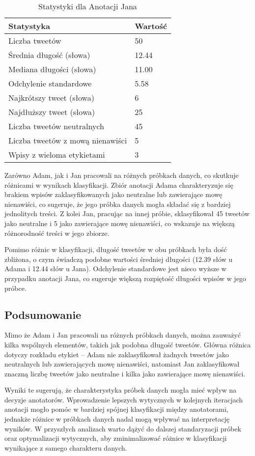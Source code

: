 \documentclass[12pt]{article}
\begin{document}
\begin{table}[h]
    \centering
    \caption{Statystyki dla Anotacji Jana}
    \label{tab:jan_stats}
    \begin{tabular}{|l|l|}
        \hline
        Statystyka & Wartość \\ \hline
        Liczba tweetów & 50 \\ \hline
        Średnia długość (słowa) & 12.44 \\ \hline
        Mediana długości (słowa) & 11.00 \\ \hline
        Odchylenie standardowe & 5.58 \\ \hline
        Najkrótszy tweet (słowa) & 6 \\ \hline
        Najdłuższy tweet (słowa) & 25 \\ \hline
        Liczba tweetów neutralnych & 45 \\ \hline
        Liczba tweetów z mową nienawiści & 5 \\ \hline
        Wpisy z wieloma etykietami & 3 \\ \hline
    \end{tabular}
\end{table}

Zarówno Adam, jak i Jan pracowali na różnych próbkach danych, co skutkuje różnicami w wynikach klasyfikacji. Zbiór anotacji Adama charakteryzuje się brakiem wpisów zaklasyfikowanych jako neutralne lub zawierające mowę nienawiści, co sugeruje, że jego próbka danych mogła składać się z bardziej jednolitych treści. Z kolei Jan, pracując na innej próbie, sklasyfikował 45 tweetów jako neutralne i 5 jako zawierające mowę nienawiści, co wskazuje na większą różnorodność treści w jego zbiorze.

Pomimo różnic w klasyfikacji, długość tweetów w obu próbkach była dość zbliżona, o czym świadczą podobne wartości średniej długości (12.39 słów u Adama i 12.44 słów u Jana). Odchylenie standardowe jest nieco wyższe w przypadku anotacji Jana, co sugeruje większą rozpiętość długości wpisów w jego próbce.

\subsection{Podsumowanie}

Mimo że Adam i Jan pracowali na różnych próbkach danych, można zauważyć kilka wspólnych elementów, takich jak podobna długość tweetów. Główna różnica dotyczy rozkładu etykiet – Adam nie zaklasyfikował żadnych tweetów jako neutralnych lub zawierających mowę nienawiści, natomiast Jan zaklasyfikował znaczną liczbę tweetów jako neutralne i kilka jako zawierające mowę nienawiści.

Wyniki te sugerują, że charakterystyka próbek danych mogła mieć wpływ na decyzje anotatorów. Wprowadzenie lepszych wytycznych w kolejnych iteracjach anotacji mogło pomóc w bardziej spójnej klasyfikacji między anotatorami, jednakże różnice w próbkach danych nadal mogą wpływać na interpretację wyników. W przyszłych analizach warto dążyć do dalszej standaryzacji próbek oraz optymalizacji wytycznych, aby zminimalizować różnice w klasyfikacji wynikające z samego charakteru danych.
\end{document}
